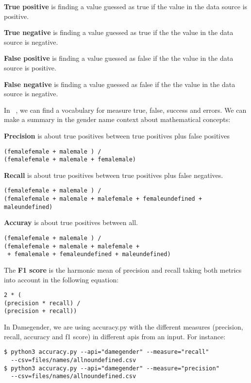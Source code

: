 \documentclass[fleqn,10pt,lineno]{wlpeerj} %
\begin{document}
\textbf{True positive} is finding a value guessed as true if the value in
the data source is positive.

\textbf{True negative} is finding a value guessed as true if the the
value in the data source is negative.

\textbf{False positive} is finding a value guessed as false if the the
value in the data source is positive.

\textbf{False negative} is finding a value guessed as false if the the
value in the data source is negative.

In ~\cite{ISO5725}, we can find a vocabulary for measure true, false,
success and errors. We can make a summary in the gender name context
about mathematical concepts:

\textbf{Precision} is about true positives between true positives plus
false positives

\begin{verbatim}
(femalefemale + malemale ) /
(femalefemale + malemale + femalemale)
\end{verbatim}

\textbf{Recall} is about true positives between true positives plus false negatives.

\begin{verbatim}
(femalefemale + malemale ) /
(femalefemale + malemale + malefemale + femaleundefined + maleundefined)
\end{verbatim}

\textbf{Accuray} is about true positives between all.

\begin{verbatim}
(femalefemale + malemale ) /
(femalefemale + malemale + malefemale +
 + femalemale + femaleundefined + maleundefined)
\end{verbatim}

The \textbf{F1 score} is the harmonic mean of precision and recall taking
both metrics into account in the following equation:

\begin{verbatim}
2 * (
(precision * recall) /
(precision + recall))
\end{verbatim}

In Damegender, we are using accuracy.py with the different measures
(precision, recall, accuracy and f1 score) in different apis from an
input. For instance:

\begin{verbatim}
$ python3 accuracy.py --api="damegender" --measure="recall"
  --csv=files/names/allnoundefined.csv
$ python3 accuracy.py --api="damegender" --measure="precision"
  --csv=files/names/allnoundefined.csv
\end{verbatim}
\end{document}
